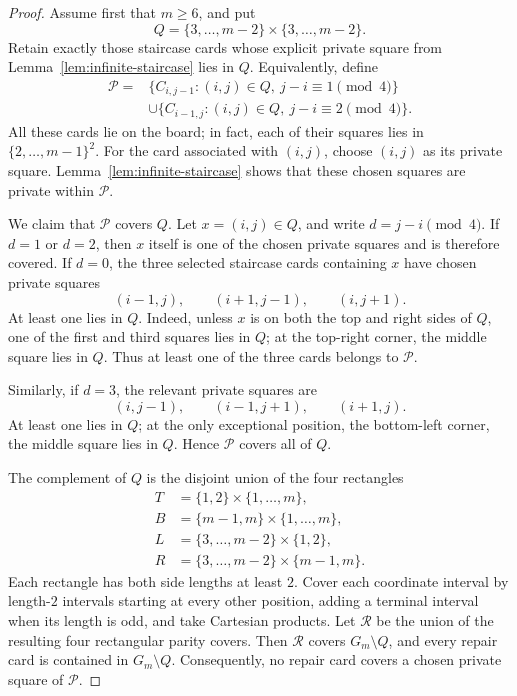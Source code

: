 \documentclass[11pt]{article}
\begin{document}
	\begin{proof}
		Assume first that \(m\ge6\), and put
		\[
		Q=\{3,\ldots,m-2\}\times\{3,\ldots,m-2\}.
		\]
		Retain exactly those staircase cards whose explicit private square from
		Lemma~\ref{lem:infinite-staircase} lies in \(Q\).  Equivalently, define
		\[
		\begin{aligned}
			\mathcal P
			={}&\{C_{i,j-1}:(i,j)\in Q,\ j-i\equiv1\pmod4\}\\
			&\mathbin{\cup}
			\{C_{i-1,j}:(i,j)\in Q,\ j-i\equiv2\pmod4\}.
		\end{aligned}
		\]
		All these cards lie on the board; in fact, each of their squares lies in
		\(\{2,\ldots,m-1\}^2\).  For the card associated with \((i,j)\), choose
		\((i,j)\) as its private square.  Lemma~\ref{lem:infinite-staircase} shows that
		these chosen squares are private within \(\mathcal P\).
		
		We claim that \(\mathcal P\) covers \(Q\).  Let \(x=(i,j)\in Q\), and write
		\(d=j-i\pmod4\).  If \(d=1\) or \(d=2\), then \(x\) itself is one of the
		chosen private squares and is therefore covered.  If \(d=0\), the three
		selected staircase cards containing \(x\) have chosen private squares
		\[
		(i-1,j),\qquad(i+1,j-1),\qquad(i,j+1).
		\]
		At least one lies in \(Q\).  Indeed, unless \(x\) is on both the top and right
		sides of \(Q\), one of the first and third squares lies in \(Q\); at the
		top-right corner, the middle square lies in \(Q\).  Thus at least one of the
		three cards belongs to \(\mathcal P\).
		
		Similarly, if \(d=3\), the relevant private squares are
		\[
		(i,j-1),\qquad(i-1,j+1),\qquad(i+1,j).
		\]
		At least one lies in \(Q\); at the only exceptional position, the bottom-left
		corner, the middle square lies in \(Q\).  Hence \(\mathcal P\) covers all of
		\(Q\).
		
		The complement of \(Q\) is the disjoint union of the four rectangles
		\[
		\begin{aligned}
			T&=\{1,2\}\times\{1,\ldots,m\},\\
			B&=\{m-1,m\}\times\{1,\ldots,m\},\\
			L&=\{3,\ldots,m-2\}\times\{1,2\},\\
			R&=\{3,\ldots,m-2\}\times\{m-1,m\}.
		\end{aligned}
		\]
		Each rectangle has both side lengths at least \(2\).  Cover each coordinate
		interval by length-\(2\) intervals starting at every other position, adding a
		terminal interval when its length is odd, and take Cartesian products.  Let
		\(\mathcal R\) be the union of the resulting four rectangular parity covers.
		Then \(\mathcal R\) covers \(G_m\setminus Q\), and every repair card is
		contained in \(G_m\setminus Q\).  Consequently, no repair card covers a chosen
		private square of \(\mathcal P\).
		

\end{proof}
\end{document}
